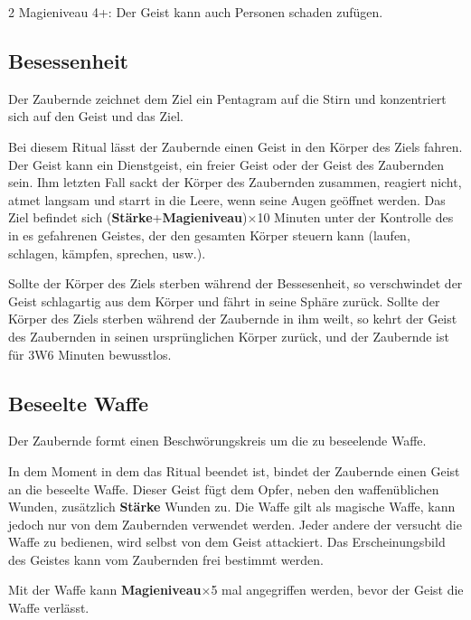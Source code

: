 \begin{multicols*}{2}
Magieniveau 4+: Der Geist kann auch Personen schaden zufügen.



\subsection{Besessenheit}

Der Zaubernde zeichnet dem Ziel ein Pentagram auf die Stirn und konzentriert sich auf den Geist und das Ziel.

Bei diesem Ritual lässt der Zaubernde einen Geist in den Körper des Ziels fahren. Der Geist kann ein Dienstgeist, ein freier Geist oder der Geist des Zaubernden sein. Ihm letzten Fall sackt der Körper des Zaubernden zusammen, reagiert nicht, atmet langsam und starrt in die Leere, wenn seine Augen geöffnet werden. Das Ziel befindet sich (\textbf{Stärke}+\textbf{Magieniveau})×10 Minuten unter der Kontrolle des in es gefahrenen Geistes, der den gesamten Körper steuern kann (laufen, schlagen, kämpfen, sprechen, usw.).

Sollte der Körper des Ziels sterben während der Bessesenheit, so verschwindet der Geist schlagartig aus dem Körper und fährt in seine Sphäre zurück. Sollte der Körper des Ziels sterben während der Zaubernde in ihm weilt, so kehrt der Geist des Zaubernden in seinen ursprünglichen Körper zurück, und der Zaubernde ist für 3W6 Minuten bewusstlos.



\subsection{Beseelte Waffe}

Der Zaubernde formt einen Beschwörungskreis um die zu beseelende Waffe.

In dem Moment in dem das Ritual beendet ist, bindet der Zaubernde einen Geist an die beseelte Waffe. Dieser Geist fügt dem Opfer, neben den waffenüblichen Wunden, zusätzlich \textbf{Stärke} Wunden zu. Die Waffe gilt als magische Waffe, kann jedoch nur von dem Zaubernden verwendet werden. Jeder andere der versucht die Waffe zu bedienen, wird selbst von dem Geist attackiert. Das Erscheinungsbild des Geistes kann vom Zaubernden frei bestimmt werden.

Mit der Waffe kann \textbf{Magieniveau}×5 mal angegriffen werden, bevor der Geist die Waffe verlässt.


\end{multicols*}
